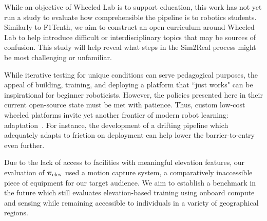 
While an objective of Wheeled Lab is to support education, this work has not yet run a study to evaluate how comprehensible the pipeline is to robotics students. Similarly to F1Tenth, we aim to construct an open curriculum around Wheeled Lab to help introduce difficult or interdisciplinary topics that may be sources of confusion. This study will help reveal what steps in the Sim2Real process might be most challenging or unfamiliar.

While iterative testing for unique conditions can serve pedagogical purposes, the appeal of building, training, and deploying a platform that ``just works" can be inspirational for beginner roboticists. However, the policies presented here in their current open-source state must be met with patience. Thus, custom low-cost wheeled platforms invite yet another frontier of modern robot learning: adaptation~\cite{bousmalis_using_2018}. For instance, the development of a drifting pipeline which adequately adapts to friction on deployment can help lower the barrier-to-entry even further.

Due to the lack of access to facilities with meaningful elevation features, our evaluation of $\boldsymbol{\pi}_{\text{elev}}$ used a motion capture system, a comparatively inaccessible piece of equipment for our target audience. We aim to establish a benchmark in the future which still evaluates elevation-based training using onboard compute and sensing while remaining accessible to individuals in a variety of geographical regions.
